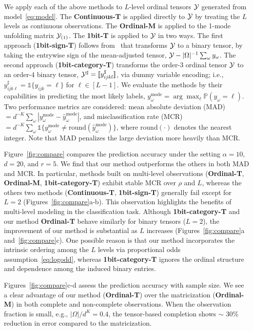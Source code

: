 \documentclass{article}
\theoremstyle{plain}
\theoremstyle{definition}
\begin{document}
We apply each of the above methods to $L$-level ordinal tensors $\mathcal{Y}$ generated from model~\eqref{eq:model}. The {\bf Continuous-T} is applied directly to $\mathcal{Y}$ by treating the $L$ levels as continuous observations. The {\bf Ordinal-M} is applied to the 1-mode unfolding matrix $\mathcal{Y}_{(1)}$. The {\bf 1bit-T} is applied to $\mathcal{Y}$ in two ways. The first approach ({\bf 1bit-sign-T}) follows from~\citet{ghadermarzy2018learning} that transforms
$\mathcal{Y}$ to a binary tensor, by taking the entrywise sign of the mean-adjusted tensor, $\mathcal{Y}- |\Omega|^{-1}\sum_\omega y_\omega$. The second approach ({\bf 1bit-category-T}) transforms the order-3 ordinal tensor $\mathcal{Y}$ to an order-4 binary tensor, $\mathcal{Y}^{\sharp}=\llbracket y^{\sharp}_{ijkl} \rrbracket$, via dummy variable encoding; i.e., $y^{\sharp}_{ijk\ell}=\mathds{1}\{y_{ijk}=\ell\}$ for $\ell\in[L-1]$. We evaluate the methods by their capabilities in predicting the most likely labels, $y_\omega^{\text{mode}}=\arg\max_\ell\mathbb{P}(y_\omega=\ell)$. Two performance metrics are considered: mean absolute deviation (MAD) $=d^{-K}\sum_\omega |y_\omega^{\text{mode}}-\hat y_\omega^{\text{mode}}|$, and misclassification rate (MCR) $=d^{-K}\sum_\omega\mathds{1}\{y_\omega^{\text{mode}}\neq\text{round}(\hat y_\omega^{\text{mode}})\}$,
where $\text{round}(\cdot)$ denotes the nearest integer. Note that MAD penalizes the large deviation more heavily than MCR.


Figure~\ref{fig:compare} compares the prediction accuracy under the setting $\alpha=10$, $d=20$, and $r=5$. We find that our method outperforms the others in both MAD and MCR. In particular, methods built on multi-level observations ({\bf Ordinal-T}, {\bf Ordinal-M}, {\bf 1bit-category-T}) exhibit stable MCR over $\rho$ and $L$, whereas the others two methods ({\bf Continuous-T}, {\bf 1bit-sign-T}) generally fail except for $L=2$ (Figures~\ref{fig:compare}a-b). This observation highlights the benefits of multi-level modeling in the classification task. Although {\bf 1bit-category-T} and our method {\bf Ordinal-T} behave similarly for binary tensors ($L=2$), the improvement of our method is substantial as $L$ increases (Figures~\ref{fig:compare}a and~\ref{fig:compare}c). One possible reason is that our method incorporates the intrinsic ordering among the $L$ levels via proportional odds assumption~\eqref{eq:logodd}, whereas {\bf 1bit-category-T} ignores the ordinal structure and dependence among the induced binary entries. 

Figures~\ref{fig:compare}c-d assess the prediction accuracy with sample size. We see a clear advantage of our method ({\bf Ordinal-T}) over the matricization ({\bf Ordinal-M}) in both complete and non-complete observations. When the observation fraction is small, e.g., ${|\Omega|/ d^K}=0.4$, the tensor-based completion shows $\sim$ 30\% reduction in error compared to the matricization.
\end{document}
